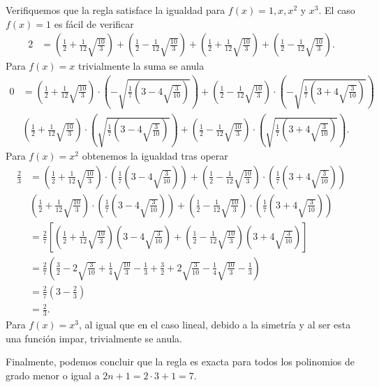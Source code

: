 \begin{solution}
  Verifiquemos que la regla satisface la igualdad para $f(x) = 1, x, x^2$ y $x^3$.
  El caso $f(x) = 1$ es f\'acil de verificar
  \begin{align*}
    2 &= \left(\frac{1}{2} + \frac{1}{12}\sqrt{\frac{10}{3}}\right)
    + \left(\frac{1}{2} - \frac{1}{12}\sqrt{\frac{10}{3}}\right)
    + \left(\frac{1}{2} + \frac{1}{12}\sqrt{\frac{10}{3}}\right)
    + \left(\frac{1}{2} - \frac{1}{12}\sqrt{\frac{10}{3}}\right).
  \end{align*}
  Para $f(x) = x$ trivialmente la suma se anula
  \begin{align*}
    0 &= \left(\frac{1}{2} + \frac{1}{12}\sqrt{\frac{10}{3}}\right) \cdot \left(- \sqrt{\frac{1}{7}\left(3 - 4 \sqrt{\frac{3}{10}}\right)}\right)
    + \left(\frac{1}{2} - \frac{1}{12}\sqrt{\frac{10}{3}}\right) \cdot \left(- \sqrt{\frac{1}{7}\left(3 + 4 \sqrt{\frac{3}{10}}\right)}\right)\\
    &\left(\frac{1}{2} + \frac{1}{12}\sqrt{\frac{10}{3}}\right) \cdot \left(\sqrt{\frac{1}{7}\left(3 - 4 \sqrt{\frac{3}{10}}\right)}\right)
    + \left(\frac{1}{2} - \frac{1}{12}\sqrt{\frac{10}{3}}\right) \cdot \left(\sqrt{\frac{1}{7}\left(3 + 4 \sqrt{\frac{3}{10}}\right)}\right).
  \end{align*}
  Para $f(x) = x^2$ obtenemos la igualdad tras operar
  \begin{align*}
    \frac{2}{3} &= \left(\frac{1}{2} + \frac{1}{12}\sqrt{\frac{10}{3}}\right) \cdot \left(\frac{1}{7}\left(3 - 4 \sqrt{\frac{3}{10}}\right)\right)
    + \left(\frac{1}{2} - \frac{1}{12}\sqrt{\frac{10}{3}}\right) \cdot \left(\frac{1}{7}\left(3 + 4 \sqrt{\frac{3}{10}}\right)\right)\\
    &\left(\frac{1}{2} + \frac{1}{12}\sqrt{\frac{10}{3}}\right) \cdot \left(\frac{1}{7}\left(3 - 4 \sqrt{\frac{3}{10}}\right)\right)
    + \left(\frac{1}{2} - \frac{1}{12}\sqrt{\frac{10}{3}}\right) \cdot \left(\frac{1}{7}\left(3 + 4 \sqrt{\frac{3}{10}}\right)\right)\\
    &= \frac{2}{7}
    \left[
      \left(
        \frac{1}{2} + \frac{1}{12}\sqrt{\frac{10}{3}}
      \right)
      \left(
        3 - 4 \sqrt{\frac{3}{10}}
      \right)
      +
      \left(
        \frac{1}{2} - \frac{1}{12}\sqrt{\frac{10}{3}}
      \right)
      \left(
        3 + 4 \sqrt{\frac{3}{10}}
      \right)
    \right] \\
    &= \frac{2}{7}
    \left(
      \frac{3}{2} - 2 \sqrt{\frac{3}{10}} + \frac{1}{4} \sqrt{\frac{10}{3}} - \frac{1}{3} + \frac{3}{2} + 2 \sqrt{\frac{3}{10}} - \frac{1}{4} \sqrt{\frac{10}{3}} - \frac{1}{3}
    \right) \\
    &= \frac{2}{7} \left(3 - \frac{2}{3}\right)\\
    &= \frac{2}{3}.
  \end{align*}
  Para $f(x) = x^3$, al igual que en el caso lineal, debido a la simetr\'ia y al ser esta una funci\'on impar, trivialmente se anula.

  Finalmente, podemos concluir que la regla es exacta para todos los polinomios de grado menor
  o igual a $2n + 1 = 2 \cdot 3 + 1 = 7$.
\end{solution}

